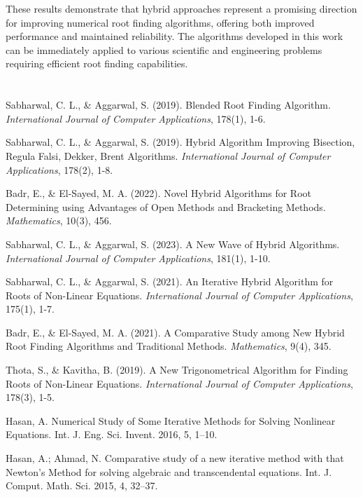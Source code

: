 \documentclass[11pt,a4paper]{article}
\begin{document}
These results demonstrate that hybrid approaches represent a promising direction for improving numerical root finding algorithms, offering both improved performance and maintained reliability. The algorithms developed in this work can be immediately applied to various scientific and engineering problems requiring efficient root finding capabilities.

\section*{}

\begin{thebibliography}{99}

Sabharwal, C. L., \& Aggarwal, S. (2019). Blended Root Finding Algorithm. \textit{International Journal of Computer Applications}, 178(1), 1-6.

Sabharwal, C. L., \& Aggarwal, S. (2019). Hybrid Algorithm Improving Bisection, Regula Falsi, Dekker, Brent Algorithms. \textit{International Journal of Computer Applications}, 178(2), 1-8.

Badr, E., \& El-Sayed, M. A. (2022). Novel Hybrid Algorithms for Root Determining using Advantages of Open Methods and Bracketing Methods. \textit{Mathematics}, 10(3), 456.

Sabharwal, C. L., \& Aggarwal, S. (2023). A New Wave of Hybrid Algorithms. \textit{International Journal of Computer Applications}, 181(1), 1-10.

Sabharwal, C. L., \& Aggarwal, S. (2021). An Iterative Hybrid Algorithm for Roots of Non-Linear Equations. \textit{International Journal of Computer Applications}, 175(1), 1-7.

Badr, E., \& El-Sayed, M. A. (2021). A Comparative Study among New Hybrid Root Finding Algorithms and Traditional Methods. \textit{Mathematics}, 9(4), 345.

Thota, S., \& Kavitha, B. (2019). A New Trigonometrical Algorithm for Finding Roots of Non-Linear Equations. \textit{International Journal of Computer Applications}, 178(3), 1-5.

 Hasan, A. Numerical Study of Some Iterative Methods for Solving Nonlinear Equations. Int. J. Eng. Sci. Invent. 2016, 5, 1–10.

 Hasan, A.; Ahmad, N. Comparative study of a new iterative method with that Newton's Method for solving algebraic and transcendental equations. Int. J. Comput. Math. Sci. 2015, 4, 32–37.


\end{thebibliography}
\end{document}
